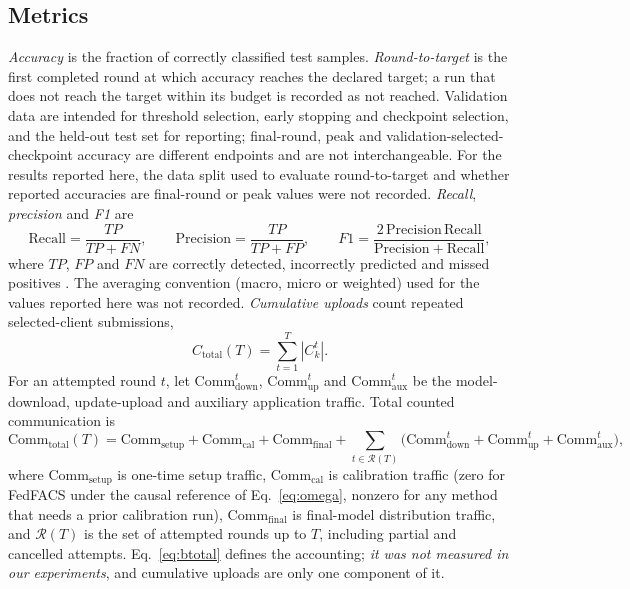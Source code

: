 \documentclass[pdflatex,sn-basic]{sn-jnl}
\begin{document}
\subsection{Metrics}\label{sec5.3}
\emph{Accuracy} is the fraction of correctly classified test samples. \emph{Round-to-target} is the first completed round at which accuracy reaches the declared target; a run that does not reach the target within its budget is recorded as not reached. Validation data are intended for threshold selection, early stopping and checkpoint selection, and the held-out test set for reporting; final-round, peak and validation-selected-checkpoint accuracy are different endpoints and are not interchangeable. For the results reported here, the data split used to evaluate round-to-target and whether reported accuracies are final-round or peak values were not recorded. \emph{Recall}, \emph{precision} and \emph{F1} are
\begin{equation}\label{eq:recall}
\mathrm{Recall}=\frac{TP}{TP+FN},\qquad \mathrm{Precision}=\frac{TP}{TP+FP},\qquad F1=\frac{2\,\mathrm{Precision}\,\mathrm{Recall}}{\mathrm{Precision}+\mathrm{Recall}},
\end{equation}
where $TP$, $FP$ and $FN$ are correctly detected, incorrectly predicted and missed positives \citep{yacouby2020}. The averaging convention (macro, micro or weighted) used for the values reported here was not recorded.
\emph{Cumulative uploads} count repeated selected-client submissions,
\begin{equation}\label{eq:ctotal}
C_{\mathrm{total}}(T)=\sum_{t=1}^{T}|C_k^t| .
\end{equation}
For an attempted round $t$, let $\mathrm{Comm}^t_{\mathrm{down}}$, $\mathrm{Comm}^t_{\mathrm{up}}$ and $\mathrm{Comm}^t_{\mathrm{aux}}$ be the model-download, update-upload and auxiliary application traffic. Total counted communication is
\begin{equation}\label{eq:btotal}
\mathrm{Comm}_{\mathrm{total}}(T)=\mathrm{Comm}_{\mathrm{setup}}+\mathrm{Comm}_{\mathrm{cal}}+\mathrm{Comm}_{\mathrm{final}}+\sum_{t\in\mathcal{R}(T)}\bigl(\mathrm{Comm}^t_{\mathrm{down}}+\mathrm{Comm}^t_{\mathrm{up}}+\mathrm{Comm}^t_{\mathrm{aux}}\bigr),
\end{equation}
where $\mathrm{Comm}_{\mathrm{setup}}$ is one-time setup traffic, $\mathrm{Comm}_{\mathrm{cal}}$ is calibration traffic (zero for FedFACS under the causal reference of Eq.~\eqref{eq:omega}, nonzero for any method that needs a prior calibration run), $\mathrm{Comm}_{\mathrm{final}}$ is final-model distribution traffic, and $\mathcal{R}(T)$ is the set of attempted rounds up to $T$, including partial and cancelled attempts. Eq.~\eqref{eq:btotal} defines the accounting; \emph{it was not measured in our experiments}, and cumulative uploads are only one component of it.
\end{document}
